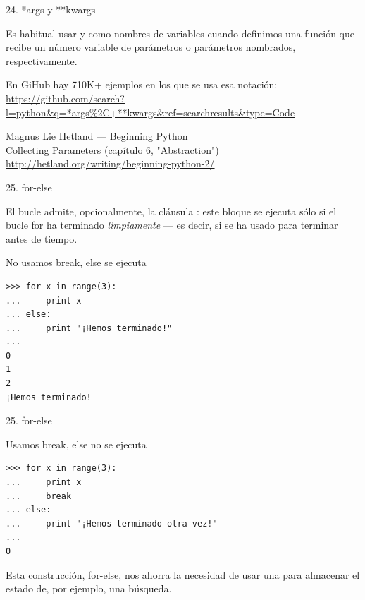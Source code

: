 \documentclass[14pt]{beamer}
\begin{document}
\begin{frame}[fragile]{24. *args y **kwargs}
  \begin{block}{}
    \small
    \centering
    Es habitual usar  y  como
    nombres de variables cuando definimos una función que recibe un
    número variable de parámetros o parámetros nombrados,
    respectivamente.
  \end{block}

  \footnotesize
  \begin{block}
    {\centering
      En GiHub hay 710K+ ejemplos en los que se usa esa notación:}
    \centering
    \url{https://github.com/search?l=python&q=*args\%2C+**kwargs&ref=searchresults&type=Code}
  \end{block}

\begin{block}
    {\centering
      Magnus Lie Hetland — Beginning Python \\
      Collecting Parameters (capítulo 6, "Abstraction")
    }
    \centering \url{http://hetland.org/writing/beginning-python-2/}
  \end{block}
\end{frame}

\begin{frame}[fragile]{25. for-else}
  \begin{block}{}
    \centering
    \small
    El bucle  admite, opcionalmente, la cláusula
    : este bloque se ejecuta sólo si el bucle for ha
    terminado \emph{limpiamente} --- es decir, si  se ha
    usado  para terminar antes de tiempo.
  \end{block}

  \small
  \begin{exampleblock}
    {No usamos break, else se ejecuta}
    \begin{lstlisting}
>>> for x in range(3):
...     print x
... else:
...     print "¡Hemos terminado!"
...
0
1
2
¡Hemos terminado!
    \end{lstlisting}
  \end{exampleblock}
\end{frame}

\begin{frame}[fragile]{25. for-else}
  \small
  \begin{exampleblock}
    {Usamos break, else no se ejecuta}
    \begin{lstlisting}
>>> for x in range(3):
...     print x
...     break
... else:
...     print "¡Hemos terminado otra vez!"
...
0
    \end{lstlisting}
  \end{exampleblock}

  \begin{alertblock}{}
    \centering
    Esta construcción, for-else, nos ahorra la necesidad de usar una
     para almacenar el estado de, por
    ejemplo, una búsqueda.
  \end{alertblock}
\end{frame}
\end{document}
